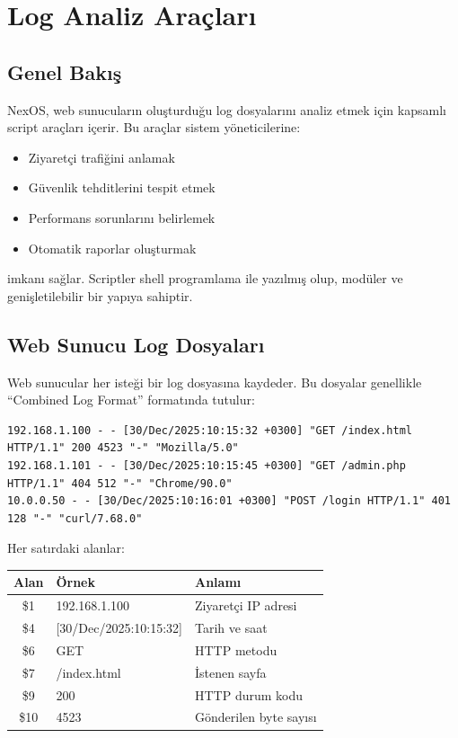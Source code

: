 \documentclass[12pt,a4paper]{report}
\begin{document}
\chapter{Log Analiz Araçları}

\section{Genel Bakış}

NexOS, web sunucuların oluşturduğu log dosyalarını analiz etmek için kapsamlı script araçları içerir. Bu araçlar sistem yöneticilerine:

\begin{itemize}
    \item Ziyaretçi trafiğini anlamak
    \item Güvenlik tehditlerini tespit etmek
    \item Performans sorunlarını belirlemek
    \item Otomatik raporlar oluşturmak
\end{itemize}

imkanı sağlar. Scriptler shell programlama ile yazılmış olup, modüler ve genişletilebilir bir yapıya sahiptir.

\section{Web Sunucu Log Dosyaları}

Web sunucular her isteği bir log dosyasına kaydeder. Bu dosyalar genellikle ``Combined Log Format'' formatında tutulur:

\begin{lstlisting}[style=bashstyle,caption={access.log Ornek Satirlar}]
192.168.1.100 - - [30/Dec/2025:10:15:32 +0300] "GET /index.html HTTP/1.1" 200 4523 "-" "Mozilla/5.0"
192.168.1.101 - - [30/Dec/2025:10:15:45 +0300] "GET /admin.php HTTP/1.1" 404 512 "-" "Chrome/90.0"
10.0.0.50 - - [30/Dec/2025:10:16:01 +0300] "POST /login HTTP/1.1" 401 128 "-" "curl/7.68.0"
\end{lstlisting}

Her satırdaki alanlar:

\begin{tabular}{|c|l|l|}
\hline
\textbf{Alan} & \textbf{Örnek} & \textbf{Anlamı} \\
\hline
\$1 & 192.168.1.100 & Ziyaretçi IP adresi \\
\$4 & [30/Dec/2025:10:15:32] & Tarih ve saat \\
\$6 & GET & HTTP metodu \\
\$7 & /index.html & İstenen sayfa \\
\$9 & 200 & HTTP durum kodu \\
\$10 & 4523 & Gönderilen byte sayısı \\
\hline
\end{tabular}
\end{document}
